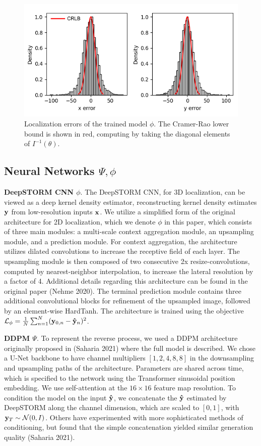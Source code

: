 \documentclass{article}
\begin{document}
\begin{figure}
\centering
\includegraphics[scale=0.7]{Errors.png}
\caption{Localization errors of the trained model $\phi$. The Cramer-Rao lower bound is shown in red, computing by taking the diagonal elements of $I^{-1}(\theta)$.}
\end{figure}


\subsection{Neural Networks $\Psi,\phi$}

\textbf{DeepSTORM CNN $\phi$}. The DeepSTORM CNN, for 3D localization, can be viewed as a deep kernel density estimator, reconstructing kernel density estimates $\bold{y}$ from low-resolution inputs $\bold{x}$. We utilize a simplified form of the original architecture for 2D localization, which we denote $\phi$ in this paper, which consists of three main modules: a multi-scale context aggregation module, an upsampling module, and a prediction module. For context aggregation, the architecture utilizes dilated convolutions to increase the receptive field of each layer. The upsampling module is then composed of two consecutive 2x resize-convolutions, computed by nearest-neighbor interpolation, to increase the lateral resolution by a factor of 4. Additional details regarding this architecture can be found in the original paper (Nehme 2020). The terminal prediction module contains three additional convolutional blocks for refinement of the upsampled image, followed by an element-wise HardTanh. The architecture is trained using the objective $\mathcal{L}_{\phi} = \frac{1}{N}\sum_{n=1}^{N} (\bold{y}_{0,n}-\bold{\hat{y}}_{n})^{2}$. 

\textbf{DDPM $\Psi$}. To represent the reverse process, we used a DDPM architecture originally proposed in (Saharia 2021) where the full model is described. We chose a U-Net backbone to have channel multipliers $[1,2,4,8,8]$ in the downsampling and upsampling paths of the architecture. Parameters are shared across time, which is specified to the network using the Transformer sinusoidal position embedding. We use self-attention at the $16 \times 16$ feature map resolution. To condition the model on the input $\bold{\hat{y}}$, we concatenate the $\bold{\hat{y}}$ estimated by DeepSTORM along the channel dimension, which are scaled to $[0,1]$, with $\bold{y}_T\sim \mathcal{N}(0, I)$. Others have experimented with more sophisticated methods of conditioning, but found that the simple concatenation yielded similar generation quality (Saharia 2021). 
\end{document}
